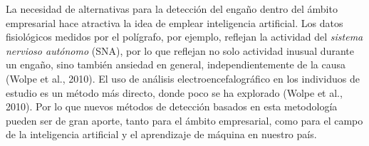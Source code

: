 La necesidad de alternativas para la detección del engaño dentro del ámbito empresarial hace atractiva la idea de emplear inteligencia artificial. Los datos fisiológicos medidos por el polígrafo, por ejemplo, reflejan la actividad del \textit{sistema nervioso autónomo} (SNA), por lo que reflejan no solo actividad inusual durante un engaño, sino también ansiedad en general, independientemente de la causa (Wolpe et al., 2010). El uso de análisis electroencefalográfico en los individuos de estudio es un método más directo, donde poco se ha explorado (Wolpe et al., 2010). Por lo que nuevos métodos de detección basados en esta metodología pueden ser de gran aporte, tanto para el ámbito empresarial, como para el campo de la inteligencia artificial y el aprendizaje de máquina en nuestro país.   